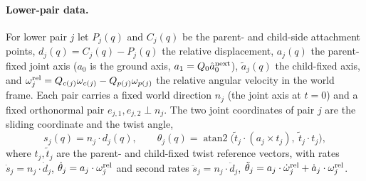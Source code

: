 
\paragraph{Lower-pair data.}
For lower pair $j$ let $P_j(q)$ and $C_j(q)$ be the parent- and child-side attachment
points, $d_j(q)=C_j(q)-P_j(q)$ the relative displacement, $a_j(q)$ the parent-fixed joint
axis ($a_0$ is the ground axis, $a_1=Q_0\hat a_{0}^{\rm next}$), $\tilde a_j(q)$ the
child-fixed axis, and $\omega^{\rm rel}_j=Q_{c(j)}\omega_{c(j)}-Q_{p(j)}\omega_{p(j)}$ the
relative angular velocity in the world frame.  Each pair carries a fixed world direction
$n_j$ (the joint axis at $t=0$) and a fixed orthonormal pair $e_{j,1},e_{j,2}\perp n_j$.
The two joint coordinates of pair $j$ are the sliding coordinate and the twist angle,
\begin{equation}
  s_j(q)=n_j\cdot d_j(q),\qquad
  \theta_j(q)=\operatorname{atan2}\bigl(\tilde t_j\cdot(a_j\times t_j),\ \tilde t_j\cdot t_j\bigr),
  \label{eq:joint-coordinates}
\end{equation}
where $t_j,\tilde t_j$ are the parent- and child-fixed twist reference vectors, with rates
$\dot s_j=n_j\cdot\dot d_j$, $\dot\theta_j=a_j\cdot\omega^{\rm rel}_j$ and second rates
$\ddot s_j=n_j\cdot\ddot d_j$, $\ddot\theta_j=a_j\cdot\dot\omega^{\rm rel}_j+\dot a_j\cdot\omega^{\rm rel}_j$.

